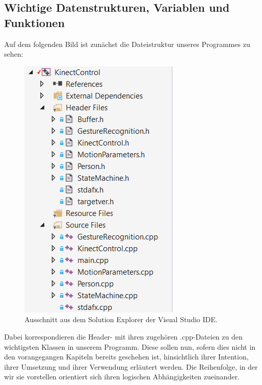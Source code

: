 	\subsection{Wichtige Datenstrukturen, Variablen und Funktionen}\label{sec:ds}
	Auf dem folgenden Bild ist zunächst die Dateistruktur unseres Programmes zu sehen:
	\begin{figure}[h]
	\centering
	\includegraphics[scale=.5]{pictures/structure.jpg}
	\caption{Ausschnitt aus dem Solution Explorer der Visual Studio IDE.}
	\end{figure}
	Dabei korrespondieren die Header- mit ihren zugehören .cpp-Dateien zu den wichtigsten Klassen in unserem Programm. Diese sollen nun, sofern dies nicht in den vorangegangen Kapiteln bereits geschehen ist, hinsichtlich ihrer Intention, ihrer Umsetzung und ihrer Verwendung erläutert werden. Die Reihenfolge, in der wir sie vorstellen orientiert sich ihren logischen Abhängigkeiten zueinander.\par\medskip

